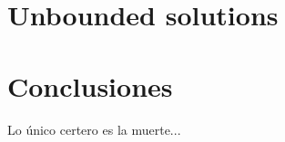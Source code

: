 \documentclass[%
 aip,
 jmp,%
 amsmath,amssymb,
 reprint,%
]{revtex4-2}
\begin{document}
\section{Unbounded solutions}




\section{Conclusiones}

Lo único certero es la muerte...

\end{document}
